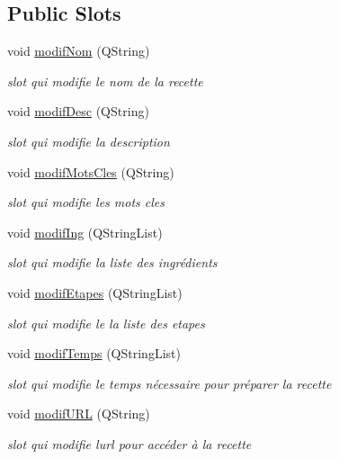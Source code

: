 \subsection*{Public Slots}
\begin{DoxyCompactItemize}
\item 
void \hyperlink{classMainWindow_ac154b320efe8998a85a93f1c41ace7e4}{modif\+Nom} (Q\+String)
\begin{DoxyCompactList}\small\item\em slot qui modifie le nom de la recette \end{DoxyCompactList}\item 
void \hyperlink{classMainWindow_a77ada7a541d869ea7f3647900ba6f6df}{modif\+Desc} (Q\+String)
\begin{DoxyCompactList}\small\item\em slot qui modifie la description \end{DoxyCompactList}\item 
void \hyperlink{classMainWindow_ae9b5aeb3f3b89a40008486d1329a68bc}{modif\+Mots\+Cles} (Q\+String)
\begin{DoxyCompactList}\small\item\em slot qui modifie les mots cles \end{DoxyCompactList}\item 
void \hyperlink{classMainWindow_a64a5116401b4a54c55c6a7d34fc7ec93}{modif\+Ing} (Q\+String\+List)
\begin{DoxyCompactList}\small\item\em slot qui modifie la liste des ingrédients \end{DoxyCompactList}\item 
void \hyperlink{classMainWindow_a1a85241ab332ebb026638ff0a6df83e0}{modif\+Etapes} (Q\+String\+List)
\begin{DoxyCompactList}\small\item\em slot qui modifie le la liste des etapes \end{DoxyCompactList}\item 
void \hyperlink{classMainWindow_aa1a396598453cdc0c4571dda33504098}{modif\+Temps} (Q\+String\+List)
\begin{DoxyCompactList}\small\item\em slot qui modifie le temps nécessaire pour préparer la recette \end{DoxyCompactList}\item 
void \hyperlink{classMainWindow_a3620273f0e53b380d70df636400e8519}{modif\+U\+RL} (Q\+String)
\begin{DoxyCompactList}\small\item\em slot qui modifie l\textquotesingle{}url pour accéder à la recette \end{DoxyCompactList}\end{DoxyCompactItemize}
